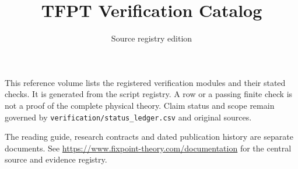
\def\TFPTdoctitle{Verification Catalog}
\title{TFPT Verification Catalog}
\author{\TFPTauthors}
\date{Source registry edition}

\maketitle
This reference volume lists the registered verification modules and their stated
checks. It is generated from the script registry. A row or a passing finite
check is not a proof of the complete physical theory. Claim status and scope
remain governed by \texttt{verification/status\_ledger.csv} and original sources.
\par\medskip
The reading guide, research contracts and dated publication history are separate
documents. See \url{https://www.fixpoint-theory.com/documentation} for the central
source and evidence registry.


